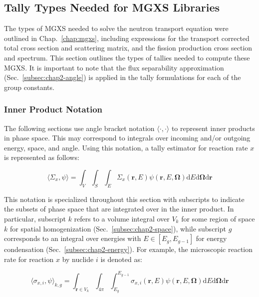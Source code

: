 \subsection{Tally Types Needed for \ac{MGXS} Libraries}
\label{subsec:chap3-tally-types}

The types of \ac{MGXS} needed to solve the neutron transport equation were outlined in Chap.~\ref{chap:mgxs}, including expressions for the transport corrected total cross section and scattering matrix, and the fission production cross section and spectrum. This section outlines the types of tallies needed to compute these \ac{MGXS}. It is important to note that the flux separability approximation (Sec.~\ref{subsec:chap2-angle}) is applied in the tally formulations for each of the group constants.

\subsubsection{Inner Product Notation}
\label{subsec:chap3-tally-types-notation}

The following sections use angle bracket notation $\langle \cdot , \cdot \rangle$ to represent inner products in phase space. This may correspond to integrals over incoming and/or outgoing energy, space, and angle. Using this notation, a tally estimator for reaction rate $x$ is represented as follows: 

\begin{equation}
\label{eqn:chap3-inner-prod-notation}
\langle \Sigma_x, \psi \rangle = \int_{V} \int_{S} \int_{E} \Sigma_{x}(\mathbf{r},E)\psi(\mathbf{r},E,\mathbf{\Omega}) \mathrm{d}E\mathrm{d}\mathbf{\Omega}\mathrm{d}\mathbf{r}
\end{equation}

\noindent This notation is specialized throughout this section with subscripts to indicate the subsets of phase space that are integrated over in the inner product. In particular, subscript $k$ refers to a volume integral over $V_{k}$ for some region of space $k$ for spatial homogenization (Sec.~\ref{subsec:chap2-space}), while subscript $g$ corresponds to an integral over energies with $E \in [E_{g}, E_{g-1}]$ for energy condensation (Sec.~\ref{subsec:chap2-energy}). For example, the microscopic reaction rate for reaction $x$ by nuclide $i$ is denoted as:

\begin{equation}
\label{eqn:chap3-angle-rxn-rate}
\langle \sigma_{x,i}, \psi \rangle_{k,g} = \int_{\mathbf{r} \in V_{k}} \int_{4\pi} \int_{E_{g}}^{E_{g-1}} \sigma_{x,i}(\mathbf{r},E)\psi(\mathbf{r},E,\mathbf{\Omega}) \mathrm{d}E\mathrm{d}\mathbf{\Omega}\mathrm{d}\mathbf{r}
\end{equation}

